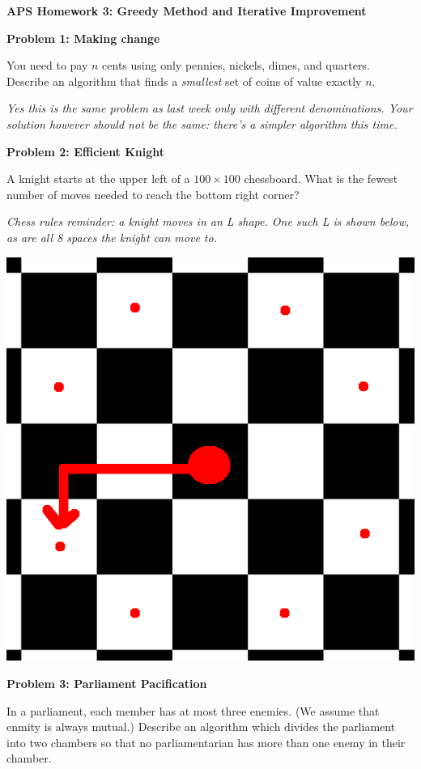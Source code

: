 \documentclass[]{article}
\begin{document}
\textbf{APS Homework 3: Greedy Method and Iterative Improvement}

\medskip
\textbf{Problem 1: Making change}

You need to pay $n$ cents using only pennies, nickels, dimes, and quarters.
Describe an algorithm that finds a \textit{smallest} set of coins of value
exactly $n$.

\textit{Yes this is the same problem as last week only with different denominations.
Your solution however should not be the same: there's a simpler algorithm this time.}

\medskip
\textbf{Problem 2: Efficient Knight}

A knight starts at the upper left of a $100 \times 100$ chessboard. What is the
fewest number of moves needed to reach the bottom right corner?

\textit{Chess rules reminder: a knight moves in an L shape. One such L is shown
below, as are all 8 spaces the knight can move to.}

\includegraphics[scale=.2,angle=90]{knight}

\medskip
\textbf{Problem 3: Parliament Pacification}

In a parliament, each member has at most three enemies. (We assume that enmity
is always mutual.) Describe an algorithm which divides the parliament into two
chambers so that no parliamentarian has more than one enemy in their chamber.
\end{document}
